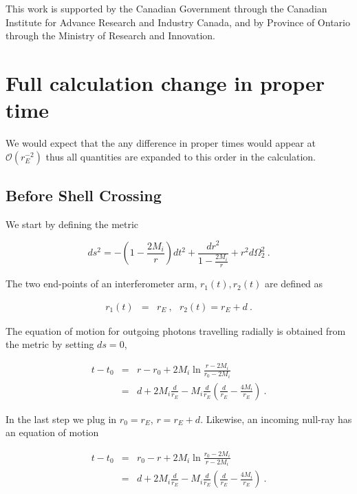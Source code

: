 \documentclass[aps,showpacs,twocolumn,floats,prd,superscriptaddress,nofootinbib]{revtex4-1}
\begin{document}
\acknowledgments

This work is supported by the Canadian Government through the Canadian Institute for Advance Research and Industry Canada, and by Province of Ontario through the Ministry of Research and Innovation.

\appendix

\section{Full calculation change in proper time}

We would expect that the any difference in proper times would appear at $\mathcal{O}(r_E^{-2})$ thus all quantities are expanded to this order in the calculation.

\subsection{Before Shell Crossing}

We start by defining the metric

\begin{equation}
ds^2 = -\left(1-\frac{2M_i}{r}\right)dt^2 + \frac{dr^2}{1-\frac{2M_i}{r}}+r^2d\Omega_2^2~.
\end{equation}

The two end-points of an interferometer arm, $r_1(t), r_2(t)$ are defined as

\begin{eqnarray}
r_1(t) &=& r_{E}~, \ \ \ r_2(t) = r_{E}+d~.
\end{eqnarray}

The equation of motion for outgoing photons travelling radially is obtained from the metric by setting $ds=0$,

\begin{eqnarray}
t-t_0 &=& r-r_0 + 2M_i\ln\frac{r-2M_i}{r_0-2M_i} \\ \nonumber
&=& d + 2M_i\frac{d}{r_E} -M_i\frac{d}{r_E}
\left( \frac{d}{r_E}-\frac{4M_i}{r_E} \right)~.
\label{eq-dt1}
\end{eqnarray}

In the last step we plug in $r_0=r_E$, $r = r_E+d$. Likewise, an incoming null-ray has an equation of motion

\begin{eqnarray}
t-t_0 &=& r_0-r + 2M_i\ln\frac{r_0-2M_i}{r-2M_i} \\ \nonumber
&=& d + 2M_i\frac{d}{r_E} - M_i\frac{d}{r_E}
\left( \frac{d}{r_E}-\frac{4M_i}{r_E} \right) ~.
\end{eqnarray}
\end{document}
